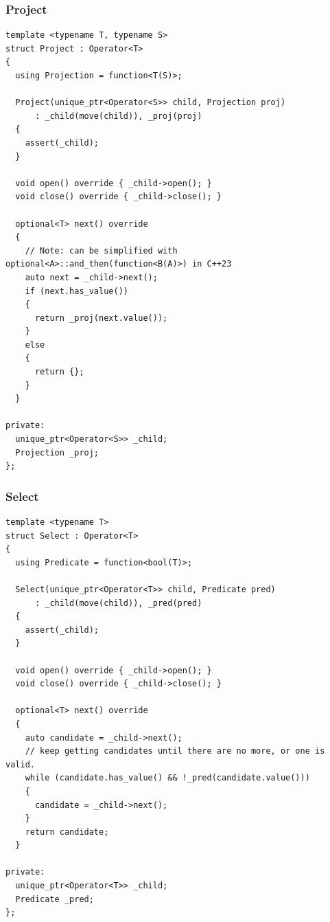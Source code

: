 \subsubsection{Project}
\begin{verbatim}
template <typename T, typename S>
struct Project : Operator<T>
{
  using Projection = function<T(S)>;

  Project(unique_ptr<Operator<S>> child, Projection proj)
      : _child(move(child)), _proj(proj)
  {
    assert(_child);
  }

  void open() override { _child->open(); }
  void close() override { _child->close(); }

  optional<T> next() override
  {
    // Note: can be simplified with optional<A>::and_then(function<B(A)>) in C++23
    auto next = _child->next();
    if (next.has_value())
    {
      return _proj(next.value());
    }
    else
    {
      return {};
    }
  }

private:
  unique_ptr<Operator<S>> _child;
  Projection _proj;
};
\end{verbatim}

\subsubsection{Select}
\begin{verbatim}
template <typename T>
struct Select : Operator<T>
{
  using Predicate = function<bool(T)>;

  Select(unique_ptr<Operator<T>> child, Predicate pred)
      : _child(move(child)), _pred(pred)
  {
    assert(_child);
  }

  void open() override { _child->open(); }
  void close() override { _child->close(); }

  optional<T> next() override
  {
    auto candidate = _child->next();
    // keep getting candidates until there are no more, or one is valid.
    while (candidate.has_value() && !_pred(candidate.value()))
    {
      candidate = _child->next();
    }
    return candidate;
  }

private:
  unique_ptr<Operator<T>> _child;
  Predicate _pred;
};
\end{verbatim}

